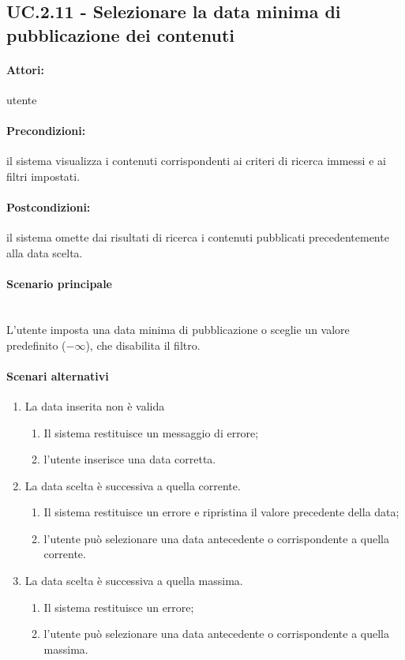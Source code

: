 \documentclass[10pt,a4paper,headinclude,footinclude,hidelinks]{scrreprt} %
\begin{document}
	\subsection[UC.2.11]{UC.2.11 - Selezionare la data minima di pubblicazione dei contenuti}
	\label{sec:stage:ar:uc:2_11}
	\paragraph{Attori:} utente
	\paragraph{Precondizioni:} il sistema visualizza i contenuti corrispondenti ai criteri di ricerca immessi e ai filtri impostati.
	\paragraph{Postcondizioni:} il sistema omette dai risultati di ricerca i contenuti pubblicati precedentemente alla data scelta.
	\paragraph{Scenario principale} \hfill \\
	L'utente imposta una data minima di pubblicazione o sceglie un valore predefinito ($-\infty$), che disabilita il filtro.
	\paragraph{Scenari alternativi}
	\begin{enumerate}
	\item La data inserita non è valida
		\begin{enumerate}
		\item Il sistema restituisce un messaggio di errore;
		\item l'utente inserisce una data corretta.
		\end{enumerate}
	\item La data scelta è successiva a quella corrente.
		\begin{enumerate}
		\item Il sistema restituisce un errore e ripristina il valore precedente della data;
		\item l'utente può selezionare una data antecedente o corrispondente a quella corrente.
		\end{enumerate}
	\item La data scelta è successiva a quella massima.
		\begin{enumerate}
		\item Il sistema restituisce un errore;
		\item l'utente può selezionare una data antecedente o corrispondente a quella massima.
		\end{enumerate}
	\end{enumerate}
\end{document}

